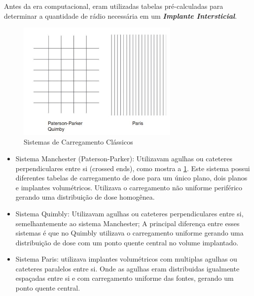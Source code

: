 \documentclass[11pt,a4paper]{article}
\begin{document}
			Antes da era computacional, eram utilizadas tabelas pré-calculadas para determinar a quantidade de rádio necessária em um \textit{\textbf{\textcolor{CarnationPink}{Implante Intersticial}}}.

			\begin{figure}[h]
				\centering
				\includegraphics[width=0.7\textwidth]{Imagens/carregamentosHistoricos.JPG}
				\caption{Sistemas de Carregamento Clássicos}
				\label{img:carregamentosHistoricos}
			\end{figure}


			\begin{itemize}
				\item Sistema Manchester (Paterson-Parker): Utilizavam agulhas ou cateteres perpendiculares entre si (crossed ends), como mostra a    \ref{img:carregamentosHistoricos}.  Este sistema possui diferentes tabelas de carregamento de dose para um único plano, dois planos e implantes volumétricos. Utilizava o carregamento não uniforme periférico gerando uma distribuição de dose homogênea.
				
				\item Sistema Quimbly: Utilizavam agulhas ou cateteres perpendiculares entre si, semelhantemente ao sistema Manchester; A principal diferença entre esses sistemas é que no Quimbly utilizava o carregamento uniforme gerando uma distribuição de dose com um ponto quente central no volume implantado. 
				
				\item Sistema Paris: utilizava implantes volumétricos com multiplas agulhas ou cateteres paralelos entre si. Onde as agulhas eram distribuidas igualmente espaçadas entre si e com carregamento uniforme das fontes, gerando um ponto quente central. 
			\end{itemize}

\end{document}
